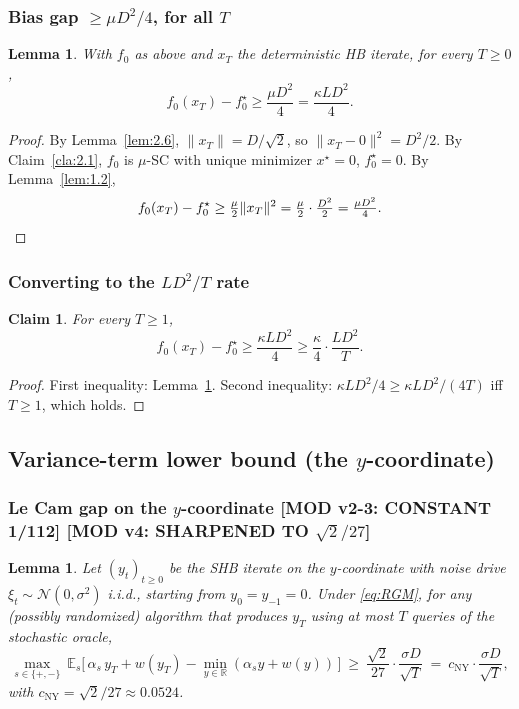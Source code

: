 \documentclass[11pt,a4paper]{article}
\theoremstyle{plain}
\newtheorem{lemma}[theorem]{Lemma}
\newtheorem{claim}[theorem]{Claim}
\theoremstyle{definition}
\theoremstyle{remark}
\newcommand{\R}{\mathbb{R}}
\newcommand{\E}{\mathbb{E}}
\begin{document}
\subsubsection{Bias gap $\geq \mu D^2 / 4$, for all $T$}

\begin{lemma}
\label{lem:2.7}
With $f_0$ as above and $x_T$ the deterministic HB iterate, for every $T \geq 0$,
\[
f_0(x_T) - f_0^\star \geq \frac{\mu D^2}{4} = \frac{\kappa L D^2}{4}.
\]
\end{lemma}

\begin{proof}
By Lemma~\ref{lem:2.6}, $\|x_T\| = D/\sqrt 2$, so $\|x_T - 0\|^2 = D^2/2$. By Claim~\ref{cla:2.1}, $f_0$ is $\mu$-SC with unique minimizer $x^\star = 0$, $f_0^\star = 0$. By Lemma~\ref{lem:1.2},
\[
f_0(x_T) - f_0^\star \geq \tfrac{\mu}{2}\|x_T\|^2 = \tfrac{\mu}{2}\cdot\tfrac{D^2}{2} = \tfrac{\mu D^2}{4}. \qedhere
\]
\end{proof}

\subsubsection{Converting to the $LD^2/T$ rate}

\begin{claim}
\label{cla:2.8}
For every $T \geq 1$,
\[
f_0(x_T) - f_0^\star \geq \frac{\kappa L D^2}{4} \geq \frac{\kappa}{4} \cdot \frac{L D^2}{T}.
\]
\end{claim}

\begin{proof}
First inequality: Lemma~\ref{lem:2.7}. Second inequality: $\kappa LD^2/4 \geq \kappa LD^2/(4T)$ iff $T \geq 1$, which holds.
\end{proof}

\subsection{Variance-term lower bound (the $y$-coordinate)}

\subsubsection{Le Cam gap on the $y$-coordinate \textbf{[MOD v2-3: CONSTANT 1/112] [MOD v4: SHARPENED TO $\sqrt 2/27$]}}

\begin{lemma}
\label{lem:2.9}
Let $(y_t)_{t \geq 0}$ be the SHB iterate on the $y$-coordinate with noise drive $\xi_t \sim \mathcal{N}(0, \sigma^2)$ i.i.d., starting from $y_0 = y_{-1} = 0$. Under \eqref{eq:RGM}, for any (possibly randomized) algorithm that produces $y_T$ using at most $T$ queries of the stochastic oracle,
\[
\max_{s \in \{+,-\}}\ \E_s\big[\,\alpha_s\, y_T + w(y_T) - \min_{y \in \R}(\alpha_s y + w(y))\,\big]\ \geq\ \frac{\sqrt 2}{27}\cdot \frac{\sigma D}{\sqrt T}\ =\ c_\mathrm{NY}\cdot\frac{\sigma D}{\sqrt T},
\]
with $c_\mathrm{NY} = \sqrt 2/27 \approx 0.0524$.
\end{lemma}
\end{document}
